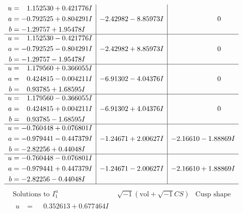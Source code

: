 \documentclass[1p]{elsarticle_modified}
\theoremstyle{definition}
\newcommand{\I}{\sqrt{-1}}
\begin{document}
$$\begin{array}{c|c|c}
\begin{aligned}
u &= \phantom{-}1.152530 + 0.421776 I \\
a &= -0.792525 + 0.804291 I \\
b &= -1.29757 + 1.95478 I\end{aligned}
 & -2.42982 - 8.85973 I & \phantom{-0.000000 } 0 \\ \hline\begin{aligned}
u &= \phantom{-}1.152530 - 0.421776 I \\
a &= -0.792525 - 0.804291 I \\
b &= -1.29757 - 1.95478 I\end{aligned}
 & -2.42982 + 8.85973 I & \phantom{-0.000000 } 0 \\ \hline\begin{aligned}
u &= \phantom{-}1.179560 + 0.366055 I \\
a &= \phantom{-}0.424815 - 0.004211 I \\
b &= \phantom{-}0.93785 + 1.68595 I\end{aligned}
 & -6.91302 - 4.04376 I & \phantom{-0.000000 } 0 \\ \hline\begin{aligned}
u &= \phantom{-}1.179560 - 0.366055 I \\
a &= \phantom{-}0.424815 + 0.004211 I \\
b &= \phantom{-}0.93785 - 1.68595 I\end{aligned}
 & -6.91302 + 4.04376 I & \phantom{-0.000000 } 0 \\ \hline\begin{aligned}
u &= -0.760448 + 0.076801 I \\
a &= -0.979441 - 0.447379 I \\
b &= -2.82256 + 0.44048 I\end{aligned}
 & -1.24671 + 2.00627 I & -2.16610 - 1.88869 I \\ \hline\begin{aligned}
u &= -0.760448 - 0.076801 I \\
a &= -0.979441 + 0.447379 I \\
b &= -2.82256 - 0.44048 I\end{aligned}
 & -1.24671 - 2.00627 I & -2.16610 + 1.88869 I\\
 \hline 
 \end{array}$$\newpage$$\begin{array}{c|c|c}  
\text{Solutions to }I^u_{1}& \I (\text{vol} + \sqrt{-1}CS) & \text{Cusp shape}\\
 \hline 
\begin{aligned}
u &= \phantom{-}0.352613 + 0.677464 I \\

\end{aligned}
\end{array}$$
\end{document}
